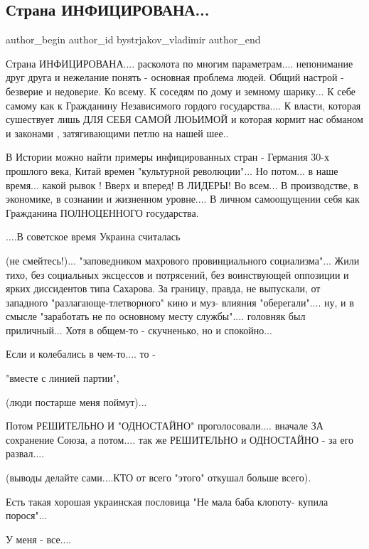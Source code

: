  
 
 
 
 
 
\subsection{Страна ИНФИЦИРОВАНА...}
\label{sec:03_12_2021.fb.bystrjakov_vladimir.1.strana_inficirovana}
 
\ifcmt
 author_begin
   author_id bystrjakov_vladimir
 author_end
\fi

Страна ИНФИЦИРОВАНА.... расколота по многим параметрам.... непонимание друг друга
и нежелание понять - основная проблема людей. Общий настрой - безверие и
недоверие. Ко всему. К соседям по дому и земному шарику... К себе самому как к
Гражданину Независимого гордого государства.... К власти, которая сушествует
лишь ДЛЯ СЕБЯ САМОЙ ЛЮЬИМОЙ и которая кормит нас обманом и  законами ,
затягивающими петлю на нашей шее..

В Истории можно найти примеры инфицированных стран - Германия 30-х прошлого
века, Китай времен "культурной революции"... Но потом... в наше время... какой
рывок ! Вверх и вперед! В ЛИДЕРЫ!  Во всем... В производстве, в экономике, в
сознании и жизненном уровне.... В личном самоощущении себя как Гражданина
ПОЛНОЦЕННОГО государства.

....В советское время Украина считалась

(не смейтесь!)... "заповедником махрового провинциального социализма"... Жили
тихо, без социальных эксцессов и потрясений, без воинствующей оппозиции и
ярких диссидентов типа Сахарова. За границу, правда, не выпускали, от западного
"разлагающе-тлетворного" кино и муз- влияния "оберегали".... ну, и в смысле
"заработать не по основному месту службы".... головняк был приличный... Хотя в
общем-то - скучненько, но и спокойно...

Если и колебались в чем-то....  то -

"вместе с линией партии", 

(люди постарше меня поймут)...

Потом РЕШИТЕЛЬНО И "ОДНОСТАЙНО" проголосовали.... вначале ЗА сохранение Союза, а
потом.... так же РЕШИТЕЛЬНО и ОДНОСТАЙНО - за его развал....

(выводы делайте сами....КТО от всего "этого" откушал больше всего).

Есть такая хорошая украинская пословица "Не мала баба клопоту- купила
порося"...

У меня - все....

